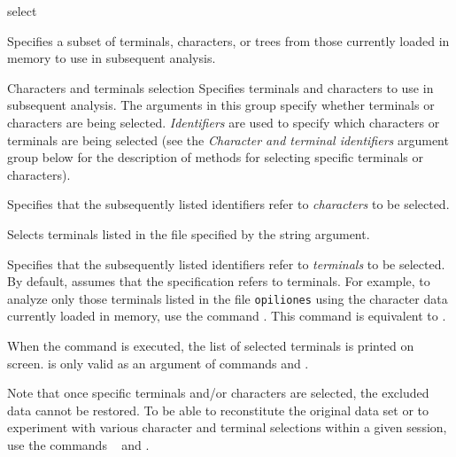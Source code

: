 \begin{command}{select}{}


    \begin{poydescription} 
        Specifies a subset of terminals, characters, or trees from those
        currently loaded in memory to use in subsequent analysis.
    \end{poydescription}
    
    \begin{arguments}
        \begin{argumentgroup}{Characters and terminals selection}
            {Specifies terminals and characters to use in subsequent
            analysis. 
            The arguments in this group specify whether terminals or characters
            are being selected.
            \emph{Identifiers} are used to specify which characters or
            terminals are being selected (see
            the \emph{Character and terminal identifiers} argument group below
            for the description of methods for selecting specific terminals or characters).}
 
                {Specifies that the subsequently listed identifiers
                refer to \emph{characters} to be selected.}
                {}

                {Selects terminals listed in the file specified by the string argument.}
                {}

                {Specifies that the subsequently listed identifiers
                refer to \emph{terminals} to be selected. By default, \poy
                assumes that the specification refers to terminals. For example, to
                analyze only those terminals listed in the file \texttt{opiliones} using
                the character data currently loaded in memory, use the command 
                . This  command is
                equivalent to .
                
                When the command is executed, the list of selected terminals is
                printed on screen.   is only valid as an
                argument of commands  and .} 
                {}
    
            \begin{statement}
                  Note that once specific terminals and/or  characters are selected, the excluded
                data cannot be restored. To be able to reconstitute the original data set or to
                experiment with various character and terminal selections within a given \poy
                session, use the commands ~ and .
            \end{statement}
    

\end{argumentgroup}
\end{arguments}
\end{command}
